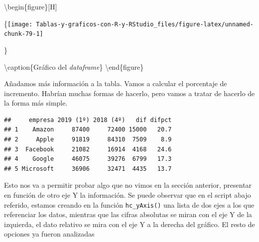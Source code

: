 \documentclass[
]{book}
\newenvironment{Shaded}{\begin{snugshade}}{\end{snugshade}}
\newcommand{\CommentTok}[1]{\textcolor[rgb]{0.56,0.35,0.01}{\textit{#1}}}
\newcommand{\DecValTok}[1]{\textcolor[rgb]{0.00,0.00,0.81}{#1}}
\newcommand{\FunctionTok}[1]{\textcolor[rgb]{0.00,0.00,0.00}{#1}}
\newcommand{\NormalTok}[1]{#1}
\newcommand{\OtherTok}[1]{\textcolor[rgb]{0.56,0.35,0.01}{#1}}
\newcommand{\SpecialCharTok}[1]{\textcolor[rgb]{0.00,0.00,0.00}{#1}}
\begin{document}
\textbackslash begin\{figure\}{[}H{]}

\{\centering \texttt{[image: Tablas-y-graficos-con-R-y-RStudio\_files/figure-latex/unnamed-chunk-79-1]}

\}

\textbackslash caption\{Gráfico del \emph{dataframe}\}\label{fig:unnamed-chunk-79}
\textbackslash end\{figure\}

Añadamos más información a la tabla. Vamos a calcular el porcentaje de incremento. Habrían muchas formas de hacerlo, pero vamos a tratar de hacerlo de la forma más simple.

\begin{Shaded}
\end{Shaded}

\begin{verbatim}
##     empresa 2019 (1º) 2018 (4º)   dif difpct
## 1    Amazon     87400     72400 15000   20.7
## 2     Apple     91819     84310  7509    8.9
## 3  Facebook     21082     16914  4168   24.6
## 4    Google     46075     39276  6799   17.3
## 5 Microsoft     36906     32471  4435   13.7
\end{verbatim}

Esto nos va a permitir probar algo que no vimos en la sección anterior, presentar en función de otro eje Y la información. Se puede observar que en el script abajo referido, estamos creando en la función \texttt{hc\_yAxis()} una lista de dos ejes a los que referenciar los datos, mientras que las cifras absolutas se miran con el eje Y de la izquierda, el dato relativo se mira con el eje Y a la derecha del gráfico. El resto de opciones ya fueron analizadas
\end{document}
